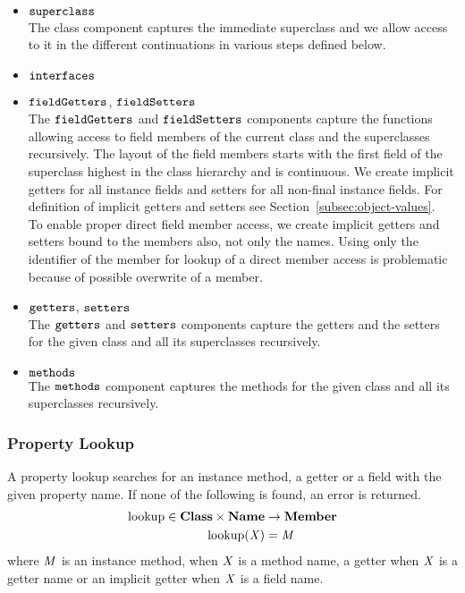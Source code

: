 \documentclass[a4paper,oneside]{article}
\DeclareMathOperator{\lookup}{lookup}
\begin{document}
\begin{itemize}
    \item $\tt{superclass}$\\
        The class component captures the immediate superclass and we allow access to it in the different continuations in various steps defined below.

    \item $\tt{interfaces}$\\

    \item $\tt{fieldGetters}$, $\tt{fieldSetters}$\\
        The $\tt{fieldGetters}$ and $\tt{fieldSetters}$ components capture the functions allowing access to field members of the current class and the superclasses recursively.
        The layout of the field members starts with the first field of the superclass highest in the class hierarchy and is continuous.
        We create implicit getters for all instance fields and setters for all non-final instance fields.
        For definition of implicit getters and setters see Section~\ref{subsec:object-values}.\\
        To enable proper direct field member access, we create implicit getters and setters bound to the members also, not only the names.
        Using only the identifier of the member for lookup of a direct member access is problematic because of possible overwrite of a member.

    \item $\tt{getters}$, $\tt{setters}$\\
        The $\tt{getters}$ and $\tt{setters}$ components capture the getters and the setters for the given class and all its superclasses recursively.

    \item $\tt{methods}$\\
        The $\tt{methods}$ component captures the methods for the given class and all its superclasses recursively.

\end{itemize}


\subsubsection{Property Lookup}
\label{subsubsec:property-lookup}

A property lookup searches for an instance method, a getter or a field with the given property name. If none of the following is found, an error is returned.
\begin{align*}
    \lookup \in \dclass \times \mathbf{Name} &\rightarrow \mathbf{Member}\\
    \lookup(\idmeta) &= \membermeta
\end{align*}
where $\mathit{M}$ is an instance method, when $\mathit{X}$ is a method name, a getter when $\mathit{X}$ is a getter name or an implicit getter when $\mathit{X}$ is a field name.
\end{document}
